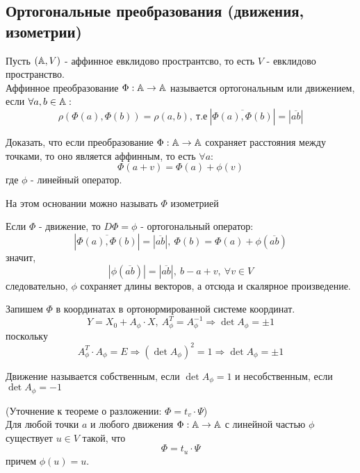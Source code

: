 \subsection*{Ортогональные преобразования (движения, изометрии)}
\begin{definition}
    Пусть $(\mathbb{A},V)$ - аффинное евклидово пространтсво, то есть $V$ - евклидово пространство.\\
    Аффинное преобразование $\Phi: \mathbb{A}\to \mathbb{A}$ называется ортогональным или движением, если $\forall a,b\in \mathbb{A}:$
    \[\rho(\Phi(a),\Phi(b))=\rho(a,b),\ \text{т.е}\ |\overline{\Phi(a),\Phi(b)}|=|\overline{ab}|\]
\end{definition} 
\begin{exercise}
    Доказать, что если преобразование $\Phi: \mathbb{A}\to \mathbb{A}$ сохраняет расстояния между точками, то оно является аффинным, то есть $\forall a:$
    \[\Phi(a+v)=\Phi(a)+\phi(v)\]
    где $\phi$ - линейный оператор.
\end{exercise}
На этом основании можно называть $\Phi$ изометрией
\begin{remark}
    Если $\Phi$ - движение, то $D\Phi=\phi$ - ортогональный оператор:
    \[|\overline{\Phi(a),\Phi(b)}|=|\overline{ab}|,\ \Phi(b)=\Phi(a)+\phi(\overline{ab})\]
    значит,
    \[|\phi(\overline{ab})|=|\overline{ab}|,\ b-a+v,\ \forall v\in V\]
    следовательно, $\phi$ сохраняет длины векторов, а отсюда и скалярное произведение.
\end{remark}
Запишем $\Phi$ в координатах в ортонормированной системе координат.
\[Y=X_0+A_{\phi}\cdot X,\ A_{\phi}^T=A_{\phi}^{-1} \Longrightarrow \det{A_{\phi}}=\pm 1\]
поскольку
\[A_{\phi}^T\cdot A_{\phi}=E \Longrightarrow (\det{A_{\phi}})^2=1 \Longrightarrow \det{A_{\phi}}=\pm 1\]
\begin{definition}
    Движение называется собственным, если $\det{A_{\phi}}=1$ и несобственным, если $\det{A_{\phi}}=-1$
\end{definition} 
\begin{remark}
    (Уточнение к теореме о разложении: $\Phi=t_v\cdot\Psi$)\\
    Для любой точки $a$ и любого движения $\Phi:\mathbb{A}\to \mathbb{A}$ с линейной частью $\phi$ существует $u\in V$ такой, что
    \[\Phi=t_u\cdot \Psi\]
    причем $\phi(u)=u$.
\end{remark}
